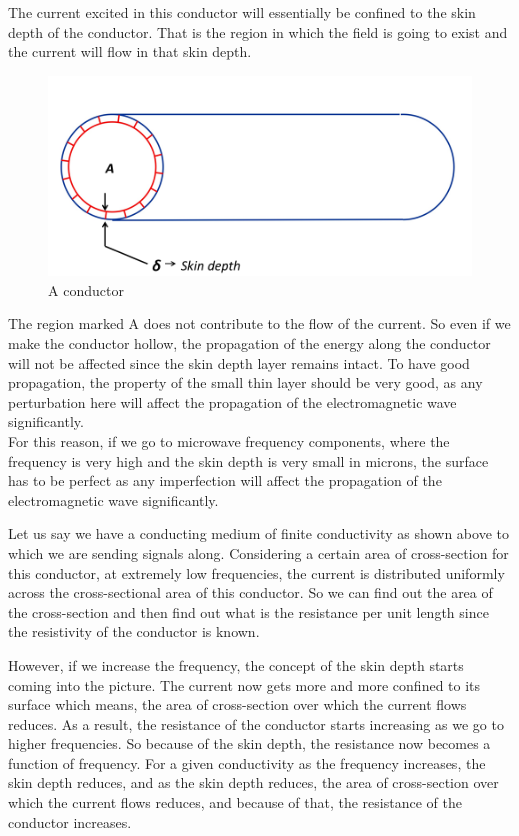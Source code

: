 The current excited in this conductor will essentially be confined to the skin depth of the conductor. That is the region in which the field is going to exist and the current will flow in that skin depth.
\begin{figure}[h]
\centering
\includegraphics[width=1\linewidth]{./graphics/skin_depth}
\caption{A conductor}
\end{figure}

The region marked A does not contribute to the flow of the current. So even if we make the conductor hollow, the propagation of the energy along the conductor will not be affected since the skin depth layer remains intact. To have good propagation, the property of the small thin layer should be very good, as any perturbation here will affect the propagation of the electromagnetic wave significantly.\\		
For this reason, if we go to microwave frequency components, where the frequency is very high and the skin depth is very small in microns, the surface has to be perfect as any imperfection will affect the propagation of the electromagnetic wave significantly.

Let us say we have a conducting medium of finite conductivity as shown above to which we are sending signals along. Considering a certain area of cross-section for this conductor, at extremely low frequencies, the current is distributed uniformly across the cross-sectional area of this conductor. So we can find out the area of the cross-section and then find out what is the resistance per unit length since the resistivity of the conductor is known.

However, if we increase the frequency, the concept of the skin depth starts coming into the picture. The current now gets more and more confined to its surface which means, the area of cross-section over which the current flows reduces. As a result, the resistance of the conductor starts increasing as we go to higher frequencies. So because of the skin depth, the resistance now becomes a function of frequency. For a given conductivity as the frequency increases, the skin depth reduces, and as the skin depth reduces, the area of cross-section over which the current flows reduces, and because of that, the resistance of the conductor increases.

